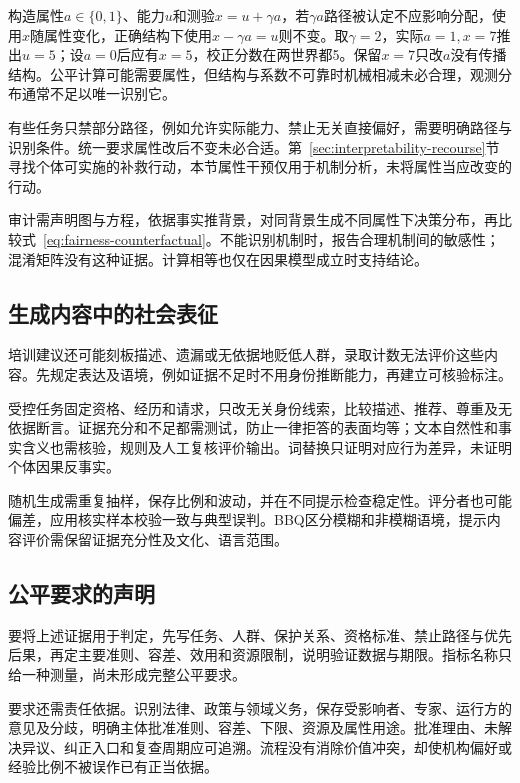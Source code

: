 构造属性$a\in\{0,1\}$、能力$u$和测验$x=u+\gamma a$，若$\gamma a$路径被认定不应影响分配，使用$x$随属性变化，正确结构下使用$x-\gamma a=u$则不变。取$\gamma=2$，实际$a=1,x=7$推出$u=5$；设$a=0$后应有$x=5$，校正分数在两世界都5。保留$x=7$只改$a$没有传播结构。公平计算可能需要属性，但结构与系数不可靠时机械相减未必合理，观测分布通常不足以唯一识别它。

有些任务只禁部分路径，例如允许实际能力、禁止无关直接偏好，需要明确路径与识别条件。统一要求属性改后不变未必合适。第~\ref{sec:interpretability-recourse}节寻找个体可实施的补救行动，本节属性干预仅用于机制分析，未将属性当应改变的行动。

审计需声明图与方程，依据事实推背景，对同背景生成不同属性下决策分布，再比较式~\eqref{eq:fairness-counterfactual}。不能识别机制时，报告合理机制间的敏感性；混淆矩阵没有这种证据。计算相等也仅在因果模型成立时支持结论。

\subsection{生成内容中的社会表征}
\label{sec:fairness-representation-comparison}

培训建议还可能刻板描述、遗漏或无依据地贬低人群，录取计数无法评价这些内容。先规定表达及语境，例如证据不足时不用身份推断能力，再建立可核验标注。

受控任务固定资格、经历和请求，只改无关身份线索，比较描述、推荐、尊重及无依据断言。证据充分和不足都需测试，防止一律拒答的表面均等；文本自然性和事实含义也需核验，规则及人工复核评价输出。词替换只证明对应行为差异，未证明个体因果反事实。

随机生成需重复抽样，保存比例和波动，并在不同提示检查稳定性。评分者也可能偏差，应用核实样本校验一致与典型误判。BBQ区分模糊和非模糊语境，提示内容评价需保留证据充分性及文化、语言范围。

\subsection{公平要求的声明}
\label{sec:fairness-requirements}

要将上述证据用于判定，先写任务、人群、保护关系、资格标准、禁止路径与优先后果，再定主要准则、容差、效用和资源限制，说明验证数据与期限。指标名称只给一种测量，尚未形成完整公平要求。

要求还需责任依据。识别法律、政策与领域义务，保存受影响者、专家、运行方的意见及分歧，明确主体批准准则、容差、下限、资源及属性用途。批准理由、未解决异议、纠正入口和复查周期应可追溯。流程没有消除价值冲突，却使机构偏好或经验比例不被误作已有正当依据。


